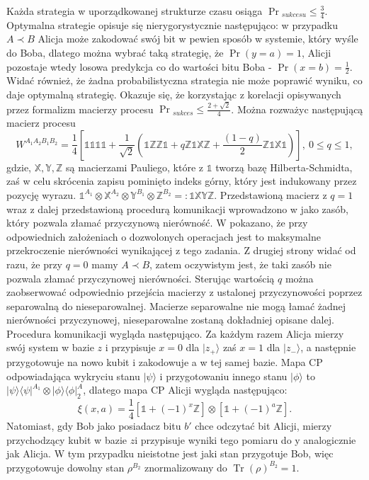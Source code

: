 \documentclass[10pt]{article} %
\DeclareMathOperator{\Trs}{Tr}
\newcommand{\Tr}[1]{\Trs(#1)}
\newcommand{\Ket}[1]{|#1\rangle}
\newcommand{\Bra}[1]{\langle#1|}
\newcommand{\WAll}{W^{A_1A_2B_1B_2}}
\newcommand{\X}{\mathbb{X}}
\newcommand{\Y}{\mathbb{Y}}
\newcommand{\Z}{\mathbb{Z}}
\newcommand{\I}{\mathbb{1}}
\begin{document}
Każda strategia w uporządkowanej strukturze czasu osiąga $\Pr{}_{sukcesu} \leq \frac{3}{4}$. Optymalna strategie opisuje się nierygorystycznie następująco: w przypadku $A \prec B$ Alicja może zakodować swój bit w pewien sposób w systemie, który wyśle do Boba, dlatego można wybrać taką strategię, że $\Pr(y=a) = 1$, Alicji pozostaje wtedy losowa predykcja co do wartości bitu Boba - $\Pr(x=b) = \frac{1}{2}$. Widać również, że żadna probabilistyczna strategia nie może poprawić wyniku, co daje optymalną strategię. Okazuje się, że korzystając z korelacji opisywanych przez formalizm macierzy procesu $\Pr{}_{sukces} \leq \frac{2+\sqrt{2}}{4}$.
Można rozważyc następującą macierz procesu
\begin{equation}
\WAll = \frac{1}{4}\left[
\I\I\I\I + \frac{1}{\sqrt{2}}(\I\Z\Z\I + q\Z\I\X\Z + \frac{(1-q)}{2}\Z\I\X\I)
\right],~ 0 \leq q \leq 1,
\end{equation}
gdzie, $\X, \Y, \Z$ są macierzami Pauliego, które z $\I$ tworzą bazę Hilberta-Schmidta, zaś w celu skrócenia zapisu pominięto indeks górny, który jest indukowany przez pozycję wyrazu. $\I^{A_1} \otimes \X^{A_2} \otimes \Y^{B_1} \otimes \Z^{B_2} =: \I\X\Y\Z$.
Przedstawioną macierz z $q=1$ wraz z dalej przedstawioną procedurą komunikacji wprowadzono w \cite{process_matrix} jako zasób, który pozwala złamać przyczynową nierówność. W \cite{max_violation} pokazano, że przy odpowiednich założeniach o dozwolonych operacjach jest to maksymalne przekroczenie nierówności
wynikającej z tego zadania. Z drugiej strony widać od razu, że przy $q=0$ mamy $A \prec B$, zatem oczywistym jest, że taki zasób nie pozwala złamać przyczynowej nierówności. Sterując wartością $q$ można zaobserwować odpowiednio przejścia macierzy z ustalonej przyczynowości poprzez separowalną do nieseparowalnej.
Macierze separowalne nie mogą łamać żadnej nierówności przyczynowej, nieseparowalne zostaną dokładniej opisane dalej. Procedura komunikacji wygląda następująco. 
Za każdym razem Alicja mierzy swój system w bazie $z$ i przypisuje $x = 0$ dla $\Ket{z_+}$ zaś $x=1$ dla $\Ket{z_-}$, a następnie przygotowuje na nowo kubit i zakodowuje a w tej samej bazie. Mapa CP odpowiadająca wykryciu stanu $\Ket{\psi}$ i przygotowaniu innego stanu $\Ket{\phi}$ to $\Ket{\psi}\Bra{\psi}^{A_1} \otimes
\Ket{\phi}\Bra{\phi}^A_2$, dlatego mapa CP Alicji wygląda następująco:
\begin{equation}
\xi(x, a) = \frac{1}{4}
\left[
\I + (-1)^x \Z
\right]
\otimes
\left[
\I  + (-1)^a \Z
\right	].
\end{equation}
Natomiast, gdy Bob jako posiadacz bitu $b'$ chce odczytać bit Alicji, mierzy przychodzący kubit w bazie $z$i przypisuje wyniki tego pomiaru do y analogicznie jak Alicja. W tym przypadku nieistotne jest jaki stan przygotuje Bob, więc przygotowuje dowolny stan $\rho^{B_2}$ znormalizowany do $\Tr \rho^{B_2} = 1$.
\end{document}
